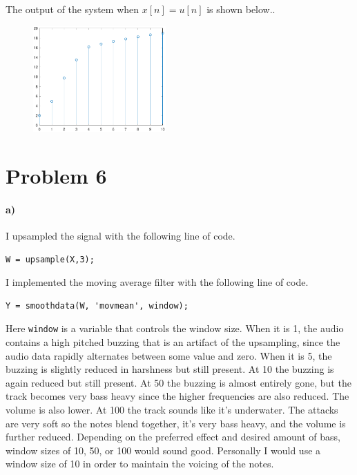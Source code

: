 \documentclass[12pt]{article}
\begin{document}
The output of the system when \(x[n]=u[n]\) is shown below..

\begin{figure}[H]
    \begin{center}
        \includegraphics[width=2in]{problem5c.pdf}
    \end{center}
\end{figure}

\section*{Problem 6}

\paragraph{a)}

I upsampled the signal with the following line of code.
\begin{verbatim}
W = upsample(X,3);
\end{verbatim}
I implemented the moving average filter with the following line of code.
\begin{verbatim}
Y = smoothdata(W, 'movmean', window);
\end{verbatim}
Here \texttt{window} is a variable that controls the window size. When it is
1, the audio contains a high pitched buzzing that is an artifact of the upsampling,
since the audio data rapidly alternates between some value and zero. When it is 5, the
buzzing is slightly reduced in harshness but still present. At 10 the buzzing is again
reduced but still present. At 50 the buzzing is almost entirely gone, but the track
becomes very bass heavy since the higher frequencies are also reduced. The volume is also
lower. At 100 the track sounds like it's underwater. The attacks are very soft so the notes
blend together, it's very bass heavy, and the volume is further reduced. Depending on
the preferred effect and desired amount of bass, window sizes of 10, 50, or 100 would sound
good. Personally I would use a window size of 10 in order to maintain the voicing of the notes.
\end{document}
